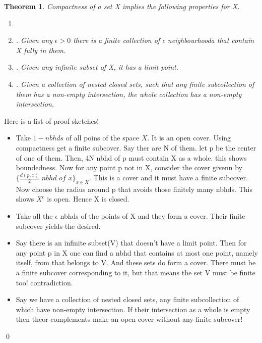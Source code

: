 \documentclass{myclass}
\newtheorem*{theorem}{Theorem}
\begin{document}
\begin{theorem}
    Compactness of a set X implies the following properties for X.
    \begin{enumerate}
        \item {}
        \item {}. Given any $\epsilon>0$ there is a finite collection of $\epsilon$ neighbourhooda that contain X fully in them.
        \item {}. Given any infinite subset of X, it has a limit point.
        \item {}. Given a collection of nested closed sets, such that any finite subcollection of them has a non-empty intersection, the whole collection has a non-empty intersection.
    \end{enumerate}
\end{theorem}
\begin{prf}Here is a list of proof sketches!
    \begin{itemize}
        \item Take $1-nbhds$ of all poins of the space $X$. It is an open cover. Using compactness get a finite subcover. Say ther are N of them. let p be the center of one of them. Then, 4N nbhd of p must contain X as a whole.
              this shows boundedness. Now for any point p not in X, consider the cover givenn by $\{\frac{d(p,x)}{2}\,\,nbhd\,\,of\,\,x\}_{x\in X}$. This is a cover and it must have a finite subcover. Now choose the radius around p that avoids those finitely many nbhds. 
              This shows $X^c$ is open. Hence X is closed.
        \item Take all the $\epsilon$ nbhds of the points of X and they form a cover. Their finite subcover yields the desired.
        \item Say there is an infinite subset(V) that doesn't have a limit point. Then for any point p in X one can find a nbhd that contains at most one point, namely itself, from that 
               belongs to V. And these sets do form a cover. There must be a finite subcover corresponding to it, but that means the set V must be finite too! contradiction.
        \item Say we have a collection of nested closed sets, any finite subcollection of which have non-empty intersection. If their intersection as a whole is empty then theor complements make an
              open cover without any finite subcover!  
    \end{itemize}
    \qed
\end{prf}
\end{document}
